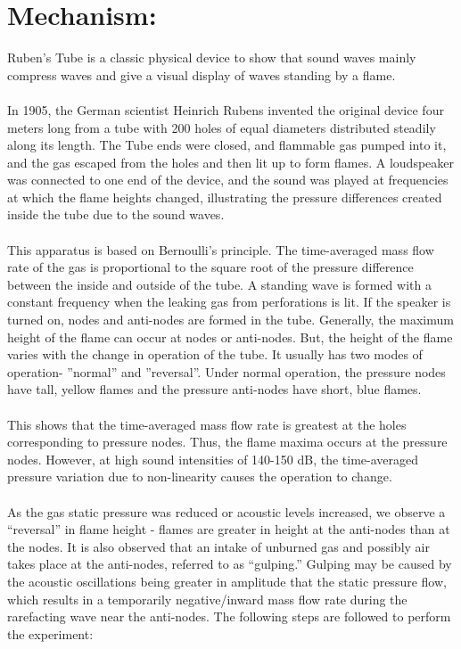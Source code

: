 \documentclass[12pt,a4paper]{article}
\begin{document}
\section{Mechanism:}
Ruben’s Tube is a classic physical device to show that sound waves mainly compress waves and give a visual display of waves standing by a flame.\\
\\In 1905, the German scientist Heinrich Rubens invented the original device four meters long from a tube with 200 holes of equal diameters distributed steadily along its length. The Tube ends were closed, and flammable gas pumped into it, and the gas escaped from the holes and then lit up to form flames. A loudspeaker was connected to one end of the device, and the sound was played at frequencies at which the flame heights changed, illustrating the pressure
differences created inside the tube due to the sound waves.\\
\\This apparatus is based on Bernoulli’s principle. The time-averaged mass flow rate of the gas is proportional to the square root of the pressure difference between the inside and outside of the tube. A standing wave is formed with a constant frequency when the leaking gas from perforations is lit. If the speaker is turned on, nodes and anti-nodes are formed in the tube. Generally, the maximum height of the flame can occur at nodes or anti-nodes. But, the height of the flame varies with the change in operation of the tube. It usually has two modes of operation- ”normal” and ”reversal”. Under normal operation, the pressure nodes have tall, yellow flames and the pressure anti-nodes have short, blue flames.\\
\\ This shows that the time-averaged mass flow rate is greatest at the holes corresponding to pressure nodes. Thus, the flame maxima occurs at the pressure nodes. However, at high sound intensities of 140-150 dB, the time-averaged pressure variation due to non-linearity causes the operation to change.\\
\\As the gas static pressure was reduced or acoustic levels increased, we observe a “reversal” in flame height - flames are greater in height at the anti-nodes than at the nodes. It is also observed that an intake of unburned gas and possibly air takes place at the anti-nodes, referred to as “gulping.” Gulping may be caused by the acoustic oscillations being greater in amplitude
that the static pressure flow, which results in a temporarily negative/inward mass flow rate during the rarefacting wave near the anti-nodes. The following steps are followed to perform the experiment:\\
\end{document}

